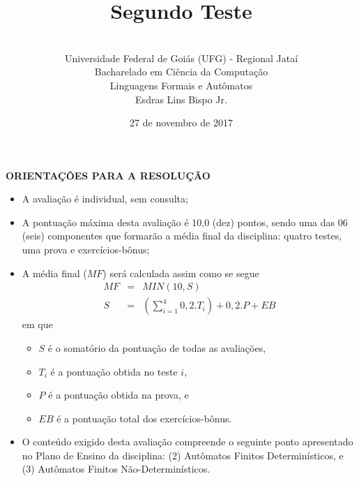 \documentclass[12pt,a4paper,oneside]{article}
\author{\\Universidade Federal de Goiás (UFG) - Regional  Jataí\\Bacharelado em Ciência da Computação \\Linguagens Formais e Autômatos \\Esdras Lins Bispo Jr.}
\date{27 de novembro de 2017}
\title{\sc \huge Segundo Teste}
\begin{document}
\maketitle

{\bf ORIENTAÇÕES PARA A RESOLUÇÃO}

\small
 
\begin{itemize}
	\item A avaliação é individual, sem consulta;
	\item A pontuação máxima desta avaliação é 10,0 (dez) pontos, sendo uma das 06 (seis) componentes que formarão a média final da disciplina: quatro testes, uma prova e exercícios-bônus;
	\item A média final ($MF$) será calculada assim como se segue
	\begin{eqnarray}
		MF & = & MIN(10, S) \nonumber \\
		S & = & (\sum_{i=1}^{4} 0,2.T_i ) + 0,2.P  + EB\nonumber
	\end{eqnarray}
	em que 
	\begin{itemize}
		\item $S$ é o somatório da pontuação de todas as avaliações,
		\item $T_i$ é a pontuação obtida no teste $i$,
		\item $P$ é a pontuação obtida na prova, e
		\item $EB$ é a pontuação total dos exercícios-bônus.
	\end{itemize}
	\item O conteúdo exigido desta avaliação compreende o seguinte ponto apresentado no Plano de Ensino da disciplina: (2) Autômatos Finitos Determinísticos, e (3) Autômatos Finitos Não-Determinísticos.
\end{itemize}

\begin{center}
\end{center}

\newpage
\end{document}
